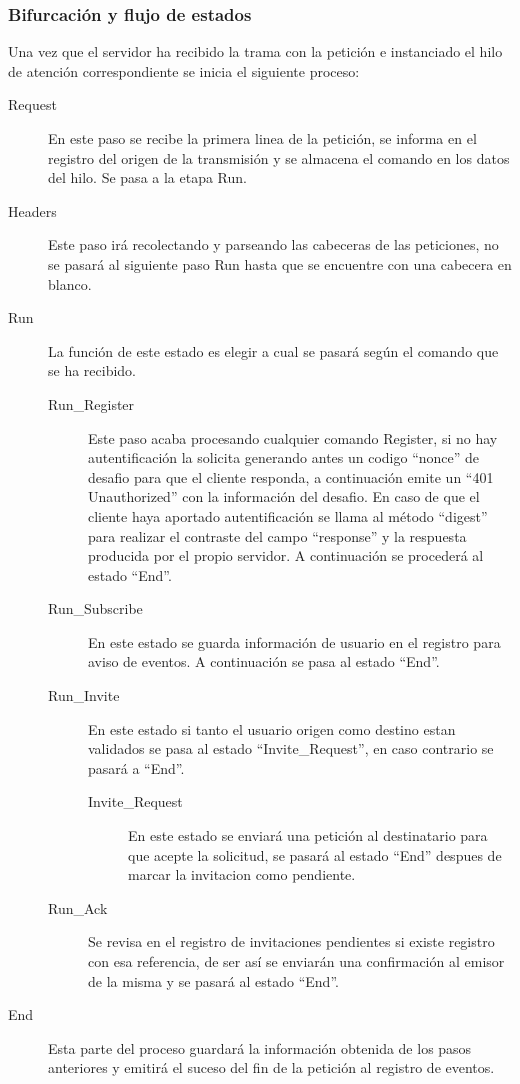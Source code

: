 \documentclass[a4paper,spanish,12pt]{book}
\begin{document}
\subsubsection{Bifurcación y flujo de estados} 
Una vez que el servidor ha recibido la trama con la petición e instanciado el hilo de atención correspondiente se inicia el siguiente proceso:
\begin{description}
	\item[Request] En este paso se recibe la primera linea de la petición, se informa en el registro del origen de la transmisión y se almacena el comando en los datos del hilo. Se pasa a la etapa Run.
	\item[Headers] Este paso irá recolectando y parseando las cabeceras de las peticiones, no se pasará al siguiente paso Run hasta que se encuentre con una cabecera en blanco.
	\item[Run] La función de este estado es elegir a cual se pasará según el comando que se ha recibido.
	\begin{description}
		\item[Run\_Register] Este paso acaba procesando cualquier comando Register, si no hay autentificación la solicita generando antes un codigo ``nonce'' de desafio para que el cliente responda, a continuación emite un ``401 Unauthorized'' con la información del desafio. En caso de que el cliente haya aportado autentificación se llama al m\'etodo ``digest'' para realizar el contraste del campo ``response'' y la respuesta producida por el propio servidor. A continuación se procederá al estado ``End''.
		\item[Run\_Subscribe] En este estado se guarda información de usuario en el registro para aviso de eventos. A continuación se pasa al estado ``End''.
		\item[Run\_Invite] En este estado si tanto el usuario origen como destino estan validados se pasa al estado ``Invite\_Request'', en caso contrario se pasará a ``End''.
		\begin{description}
			\item[Invite\_Request] En este estado se enviará una petición al destinatario para que acepte la solicitud, se pasará al estado ``End'' despues de marcar la invitacion como pendiente.
		\end{description}
		\item[Run\_Ack] Se revisa en el registro de invitaciones pendientes si existe registro con esa referencia, de ser así se enviarán una confirmación al emisor de la misma y se pasará al estado ``End''.
	\end{description}
	\item[End] Esta parte del proceso guardará la información obtenida de los pasos anteriores y emitirá el suceso del fin de la petición al registro de eventos.
\end{description}
\end{document}
